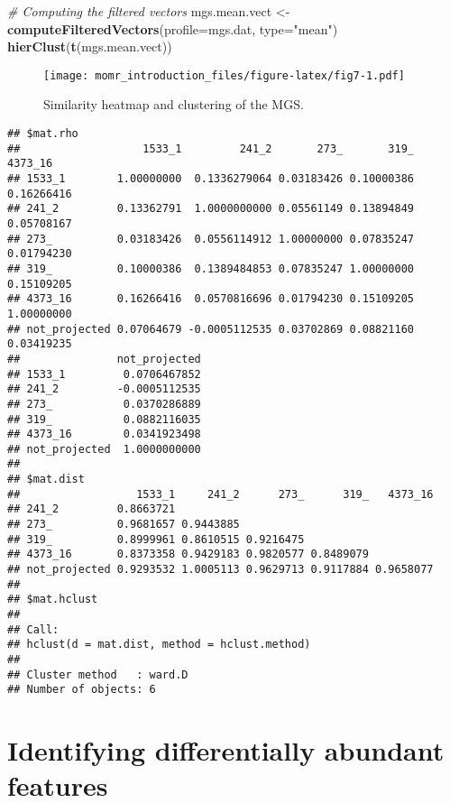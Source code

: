 \documentclass[]{article}
\newenvironment{Shaded}{\begin{snugshade}}{\end{snugshade}}
\newcommand{\KeywordTok}[1]{\textcolor[rgb]{0.13,0.29,0.53}{\textbf{{#1}}}}
\newcommand{\DataTypeTok}[1]{\textcolor[rgb]{0.13,0.29,0.53}{{#1}}}
\newcommand{\StringTok}[1]{\textcolor[rgb]{0.31,0.60,0.02}{{#1}}}
\newcommand{\CommentTok}[1]{\textcolor[rgb]{0.56,0.35,0.01}{\textit{{#1}}}}
\newcommand{\NormalTok}[1]{{#1}}
\begin{document}
\begin{Shaded}
\begin{Highlighting}[]
\CommentTok{# Computing the filtered vectors}
\NormalTok{mgs.mean.vect <-}\StringTok{ }\KeywordTok{computeFilteredVectors}\NormalTok{(}\DataTypeTok{profile=}\NormalTok{mgs.dat, }\DataTypeTok{type=}\StringTok{"mean"}\NormalTok{)}
\KeywordTok{hierClust}\NormalTok{(}\KeywordTok{t}\NormalTok{(mgs.mean.vect))}
\end{Highlighting}
\end{Shaded}

\begin{figure}[htbp]
\centering
\texttt{[image: momr\_introduction\_files/figure-latex/fig7-1.pdf]}
\caption{Similarity heatmap and clustering of the MGS.}
\end{figure}

\begin{verbatim}
## $mat.rho
##                   1533_1         241_2       273_       319_    4373_16
## 1533_1        1.00000000  0.1336279064 0.03183426 0.10000386 0.16266416
## 241_2         0.13362791  1.0000000000 0.05561149 0.13894849 0.05708167
## 273_          0.03183426  0.0556114912 1.00000000 0.07835247 0.01794230
## 319_          0.10000386  0.1389484853 0.07835247 1.00000000 0.15109205
## 4373_16       0.16266416  0.0570816696 0.01794230 0.15109205 1.00000000
## not_projected 0.07064679 -0.0005112535 0.03702869 0.08821160 0.03419235
##               not_projected
## 1533_1         0.0706467852
## 241_2         -0.0005112535
## 273_           0.0370286889
## 319_           0.0882116035
## 4373_16        0.0341923498
## not_projected  1.0000000000
## 
## $mat.dist
##                  1533_1     241_2      273_      319_   4373_16
## 241_2         0.8663721                                        
## 273_          0.9681657 0.9443885                              
## 319_          0.8999961 0.8610515 0.9216475                    
## 4373_16       0.8373358 0.9429183 0.9820577 0.8489079          
## not_projected 0.9293532 1.0005113 0.9629713 0.9117884 0.9658077
## 
## $mat.hclust
## 
## Call:
## hclust(d = mat.dist, method = hclust.method)
## 
## Cluster method   : ward.D 
## Number of objects: 6
\end{verbatim}

\section{Identifying differentially abundant
features}\label{identifying-differentially-abundant-features}
\end{document}
